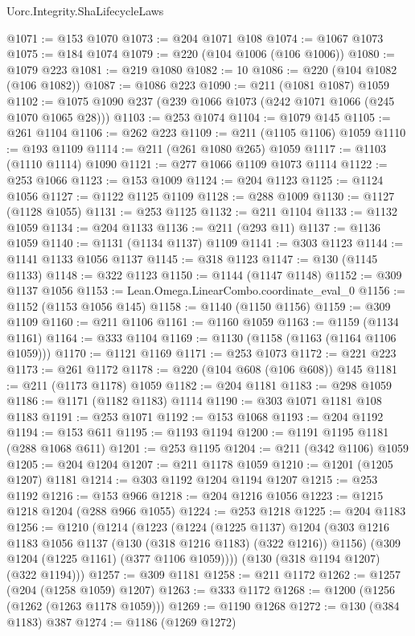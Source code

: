 \begin{lexlean}{Uorc.Integrity.ShaLifecycleLaws}
\begin{coremodule}
@1071 := @153 @1070
@1073 := @204 @1071 @108
@1074 := @1067 @1073
@1075 := @184 @1074
@1079 := @220 (@104 @1006 (@106 @1006))
@1080 := @1079 @223
@1081 := @219 @1080
@1082 := 10
@1086 := @220 (@104 @1082 (@106 @1082))
@1087 := @1086 @223
@1090 := @211 (@1081 @1087) @1059
@1102 := @1075 @1090 @237 (@239 @1066 @1073 (@242 @1071 @1066 (@245 @1070 @1065 @28)))
@1103 := @253 @1074
@1104 := @1079 @145
@1105 := @261 @1104
@1106 := @262 @223
@1109 := @211 (@1105 @1106) @1059
@1110 := @193 @1109
@1114 := @211 (@261 @1080 @265) @1059
@1117 := @1103 (@1110 @1114) @1090
@1121 := @277 @1066 @1109 @1073 @1114
@1122 := @253 @1066
@1123 := @153 @1009
@1124 := @204 @1123
@1125 := @1124 @1056
@1127 := @1122 @1125 @1109
@1128 := @288 @1009
@1130 := @1127 (@1128 @1055)
@1131 := @253 @1125
@1132 := @211 @1104
@1133 := @1132 @1059
@1134 := @204 @1133
@1136 := @211 (@293 @11)
@1137 := @1136 @1059
@1140 := @1131 (@1134 @1137) @1109
@1141 := @303 @1123
@1144 := @1141 @1133 @1056 @1137
@1145 := @318 @1123
@1147 := @130 (@1145 @1133)
@1148 := @322 @1123
@1150 := @1144 (@1147 @1148)
@1152 := @309 @1137 @1056
@1153 := Lean.Omega.LinearCombo.coordinate_eval_0
@1156 := @1152 (@1153 @1056 @145)
@1158 := @1140 (@1150 @1156)
@1159 := @309 @1109
@1160 := @211 @1106
@1161 := @1160 @1059
@1163 := @1159 (@1134 @1161)
@1164 := @333 @1104
@1169 := @1130 (@1158 (@1163 (@1164 @1106 @1059)))
@1170 := @1121 @1169
@1171 := @253 @1073
@1172 := @221 @223
@1173 := @261 @1172
@1178 := @220 (@104 @608 (@106 @608)) @145
@1181 := @211 (@1173 @1178) @1059
@1182 := @204 @1181
@1183 := @298 @1059
@1186 := @1171 (@1182 @1183) @1114
@1190 := @303 @1071 @1181 @108 @1183
@1191 := @253 @1071
@1192 := @153 @1068
@1193 := @204 @1192
@1194 := @153 @611
@1195 := @1193 @1194
@1200 := @1191 @1195 @1181 (@288 @1068 @611)
@1201 := @253 @1195
@1204 := @211 (@342 @1106) @1059
@1205 := @204 @1204
@1207 := @211 @1178 @1059
@1210 := @1201 (@1205 @1207) @1181
@1214 := @303 @1192 @1204 @1194 @1207
@1215 := @253 @1192
@1216 := @153 @966
@1218 := @204 @1216 @1056
@1223 := @1215 @1218 @1204 (@288 @966 @1055)
@1224 := @253 @1218
@1225 := @204 @1183
@1256 := @1210
    (@1214
      (@1223
        (@1224
          (@1225 @1137)
          @1204
          (@303 @1216 @1183 @1056 @1137 (@130 (@318 @1216 @1183) (@322 @1216)) @1156)
          (@309 @1204 (@1225 @1161) (@377 @1106 @1059))))
      (@130 (@318 @1194 @1207) (@322 @1194)))
@1257 := @309 @1181
@1258 := @211 @1172
@1262 := @1257 (@204 (@1258 @1059) @1207)
@1263 := @333 @1172
@1268 := @1200 (@1256 (@1262 (@1263 @1178 @1059)))
@1269 := @1190 @1268
@1272 := @130 (@384 @1183) @387
@1274 := @1186 (@1269 @1272)

\end{coremodule}
\end{lexlean}

